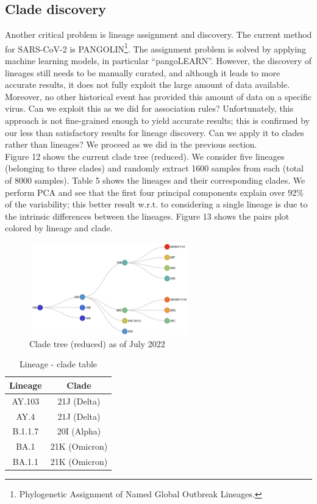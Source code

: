 \documentclass[twoside,twocolumn]{article}
\begin{document}
	\subsection{Clade discovery}
	Another critical problem is lineage assignment and discovery. The current method for SARS-CoV-2 is PANGOLIN\footnote{Phylogenetic Assignment of Named Global Outbreak Lineages.}\cite{pango}. The assignment problem is solved by applying machine learning models, in particular \textquotedblleft pangoLEARN\textquotedblright\cite{pangolearn}. However, the discovery of lineages still needs to be manually curated, and although it leads to more accurate results, it does not fully exploit the large amount of data available. Moreover, no other historical event has provided this amount of data on a specific virus. Can we exploit this as we did for association rules? Unfortunately, this approach is not fine-grained enough to yield accurate results; this is confirmed by our less than satisfactory results for lineage discovery. Can we apply it to clades rather than lineages? We proceed as we did in the previous section.
	\\Figure 12 shows the current clade tree (reduced). We consider five lineages (belonging to three clades) and randomly extract 1600 samples from each (total of 8000 samples). Table 5 shows the lineages and their corresponding clades. We perform PCA and see that the first four principal components explain over 92\% of the variability; this better result w.r.t. to considering a single lineage is due to the intrinsic differences between the lineages. Figure 13 shows the pairs plot colored by lineage and clade.
	\begin{figure}[h]
		\caption{Clade tree (reduced) as of July 2022}
		\label{clades}
		\centering
		\includegraphics[width=70mm, height=40mm]{clades.png}
	\end{figure}
	\begin{table}
		\caption{Lineage - clade table}
		\centering
		\renewcommand{\tabcolsep}{2pc} %
		\renewcommand{\arraystretch}{1.2} %
		\begin{tabular}{| c | c |}
			\hline
			Lineage & Clade \\
			\hline
			AY.103 & 21J (Delta) \\
			AY.4 & 21J (Delta) \\
			B.1.1.7 & 20I (Alpha) \\
			BA.1 & 21K (Omicron) \\
			BA.1.1 & 21K (Omicron)\\
			\hline
		\end{tabular}
	\end{table}
\end{document}
